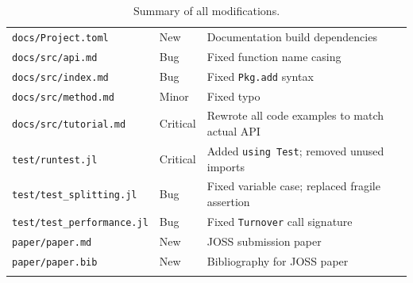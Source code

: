 \documentclass[11pt,a4paper]{article}
\begin{document}
\begin{longtable}{@{}llp{7cm}@{}}
\texttt{docs/Project.toml}        & New       & Documentation build dependencies \\
\texttt{docs/src/api.md}          & Bug       & Fixed function name casing \\
\texttt{docs/src/index.md}        & Bug       & Fixed \texttt{Pkg.add} syntax \\
\texttt{docs/src/method.md}       & Minor     & Fixed typo \\
\texttt{docs/src/tutorial.md}     & Critical  & Rewrote all code examples to match actual API \\
\texttt{test/runtest.jl}          & Critical  & Added \texttt{using Test}; removed unused imports \\
\texttt{test/test\_splitting.jl}  & Bug       & Fixed variable case; replaced fragile assertion \\
\texttt{test/test\_performance.jl}& Bug       & Fixed \texttt{Turnover} call signature \\
\texttt{paper/paper.md}           & New       & JOSS submission paper \\
\texttt{paper/paper.bib}          & New       & Bibliography for JOSS paper \\
\bottomrule
\caption{Summary of all modifications.}
\label{tab:summary}
\end{longtable}
\end{document}
